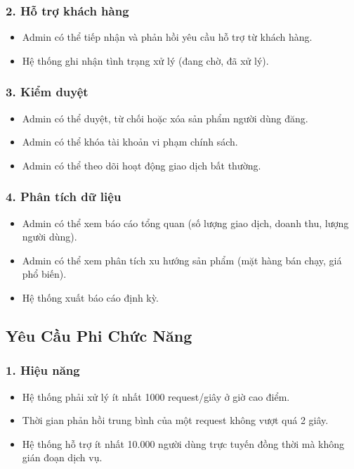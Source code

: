 \documentclass{article}
\begin{document}
\subsubsection*{2. Hỗ trợ khách hàng}
\begin{itemize}
    \item Admin có thể tiếp nhận và phản hồi yêu cầu hỗ trợ từ khách hàng.
    \item Hệ thống ghi nhận tình trạng xử lý (đang chờ, đã xử lý).
\end{itemize}

\subsubsection*{3. Kiểm duyệt}
\begin{itemize}
    \item Admin có thể duyệt, từ chối hoặc xóa sản phẩm người dùng đăng.
    \item Admin có thể khóa tài khoản vi phạm chính sách.
    \item Admin có thể theo dõi hoạt động giao dịch bất thường.
\end{itemize}
\subsubsection*{4. Phân tích dữ liệu}
\begin{itemize}
    \item Admin có thể xem báo cáo tổng quan (số lượng giao dịch, doanh thu, lượng người dùng).
    \item Admin có thể xem phân tích xu hướng sản phẩm (mặt hàng bán chạy, giá phổ biến).
    \item Hệ thống xuất báo cáo định kỳ.
\end{itemize}

\subsection{Yêu Cầu Phi Chức Năng}

\subsubsection*{1. Hiệu năng}
\begin{itemize}
    \item Hệ thống phải xử lý ít nhất 1000 request/giây ở giờ cao điểm.
    \item Thời gian phản hồi trung bình của một request không vượt quá 2 giây.
    \item Hệ thống hỗ trợ ít nhất 10.000 người dùng trực tuyến đồng thời mà không gián đoạn dịch vụ.
\end{itemize}
\end{document}
